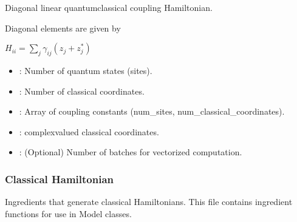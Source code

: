 \documentclass[letterpaper,10pt,english]{sphinxmanual}
\begin{document}
\begin{fulllineitems}
\label{\detokenize{software_reference/ingredients/ingredients:qc_lab.ingredients.diagonal_linear_h_qc}}
\pysigstartsignatures
\pysiglinewithargsret
{}
{\sphinxparamcomma {}\sphinxparamcomma {}\sphinxparamcomma {}}
{}
\pysigstopsignatures
\sphinxAtStartPar
Diagonal linear quantum\sphinxhyphen{}classical coupling Hamiltonian.

\sphinxAtStartPar
Diagonal elements are given by

\sphinxAtStartPar
\(H_{ii} = \sum_{j} \gamma_{ij} (z_{j} + z_{j}^*)\)
\begin{description}
\begin{itemize}
\item {} 
\sphinxAtStartPar
{}: Number of quantum states (sites).

\item {} 
\sphinxAtStartPar
{}: Number of classical coordinates.

\item {} 
\sphinxAtStartPar
{}: Array of coupling constants (num\_sites, num\_classical\_coordinates).

\end{itemize}

\begin{itemize}
\item {} 
\sphinxAtStartPar
{}: complex\sphinxhyphen{}valued classical coordinates.

\item {} 
\sphinxAtStartPar
{}: (Optional) Number of batches for vectorized computation.

\end{itemize}

\end{description}

\end{fulllineitems}



\subsubsection{Classical Hamiltonian}
\label{\detokenize{software_reference/ingredients/ingredients:classical-hamiltonian}}
\sphinxAtStartPar
Ingredients that generate classical Hamiltonians.
\label{\detokenize{software_reference/ingredients/ingredients:module-1}}
\sphinxAtStartPar
This file contains ingredient functions for use in Model classes.
\end{document}

